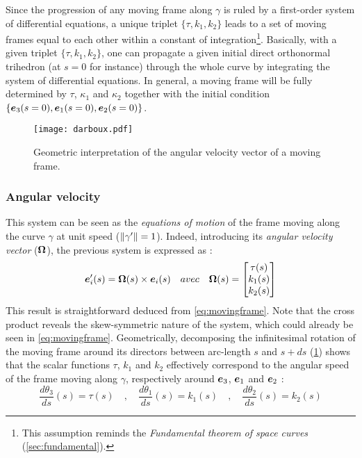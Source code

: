 Since the progression of any moving frame along $\gamma$ is ruled by a first-order system of differential equations, a unique triplet $\{\tau, k_{1}, k_{2}\}$ leads to a set of moving frames equal to each other within a constant of integration\footnote{
This assumption reminds the \emph{Fundamental theorem of space curves} (\cref{sec:fundamental}).
}. Basically, with a given triplet $\{\tau, k_{1}, k_{2}\}$, one can propagate a given initial direct orthonormal trihedron (at $s=0$ for instance) through the whole curve by integrating the system of differential equations. In general, a moving frame will be fully determined by $\tau$, $\kappa_{1}$ and $\kappa_{2}$ together with the initial condition $\{\boldsymbol{e}_{3}(s=0),\boldsymbol{e}_{1}(s=0),\boldsymbol{e}_{2}(s=0)\}$.

\begin{figure}[t]
\centering
\texttt{[image: darboux.pdf]}
\caption{Geometric interpretation of the angular velocity vector of a moving frame.}
\label{fig:3_4}
\end{figure}

\subsubsection{Angular velocity}
This system can be seen as the \emph{equations of motion} of the frame moving along the curve $\gamma$ at unit speed ($\lVert\gamma'\rVert=1$). Indeed, introducing its \emph{angular velocity vector} ($\boldsymbol{\Omega}$), the previous system is expressed as :
\begin{equation}
	\boldsymbol{e}'_{i}(s) = \boldsymbol{\Omega}(s) \times \boldsymbol{e}_{i}(s)
	\quad avec \quad
	\boldsymbol{\Omega}(s)
	=
	\begin{bmatrix}
		\tau(s) \\
		k_1(s) \\
		k_2(s)
	\end{bmatrix}
\end{equation}
This result is straightforward deduced from \cref{eq:movingframe}. Note that the cross product reveals the skew-symmetric nature of the system, which could already be seen in \cref{eq:movingframe}.
Geometrically, decomposing the infinitesimal rotation of the moving frame around its directors between arc-length $s$ and $s+ds$ (\cref{fig:3_4}) shows that the scalar functions $\tau$, $k_{1}$ and $k_{2}$ effectively correspond to the angular speed of the frame moving along $\gamma$, respectively around $\boldsymbol{e}_{3}$, $\boldsymbol{e}_{1}$ and $\boldsymbol{e}_{2}$ :
\begin{equation}
	\frac{d\theta_3}{ds}(s) = \tau(s)
	\quad,\quad
	\frac{d\theta_1}{ds}(s) = k_{1}(s)
	\quad,\quad
	\frac{d\theta_2}{ds}(s) = k_{2}(s)
\end{equation}

